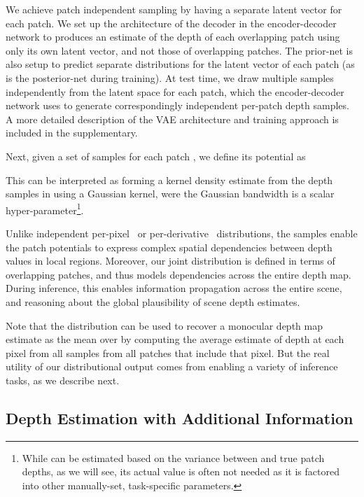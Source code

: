 \documentclass[10pt,twocolumn,letterpaper]{article}
\begin{document}
We achieve patch independent sampling by having a separate latent vector for each patch. We set up the architecture of the decoder in the encoder-decoder network to produces an estimate of the depth of each overlapping patch using only its own latent vector,  and not those of overlapping patches. The prior-net is also setup to predict separate distributions for the latent vector of each patch (as is the posterior-net during training). At test time, we draw multiple samples independently from the latent space for each patch, which the encoder-decoder network uses to generate correspondingly independent per-patch depth samples. A more detailed description of the VAE architecture and training approach is included in the supplementary. 

 Next, given a set  of samples  for each patch , we define its potential  as

This can be interpreted as forming a kernel density estimate from the depth samples in  using a Gaussian kernel, were the Gaussian bandwidth  is a scalar hyper-parameter\footnote{While  can be estimated based on the variance between  and true patch depths, as we will see, its actual value is often not needed as it is factored into other manually-set, task-specific parameters.}.

Unlike independent per-pixel~\cite{kendall2017uncertainties,heo2018monocular,liu2019neural} or per-derivative~\cite{chakrabarti2016depth} distributions, the samples  enable the patch potentials  to express complex spatial dependencies between depth values in local regions. Moreover, our joint distribution  is defined in terms of overlapping patches, and thus models dependencies across the entire depth map. During inference, this enables information propagation across the entire scene, and reasoning about the global plausibility of scene depth estimates. 

Note that the distribution  can be used to recover a monocular depth map estimate as the mean over  by computing the average estimate of depth at each pixel from all samples from all patches that include that pixel. But the real utility of our distributional output comes from enabling a variety of inference tasks, as we describe next.

\subsection{Depth Estimation with Additional Information}
\label{sec:addinf}
\end{document}
